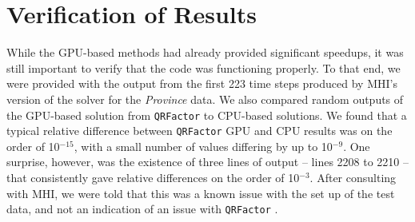 \documentclass[11pt,letterpaper]{article}
\newcommand{\qrf}{\texttt{QRFactor} }
\begin{document}

\section*{Verification of Results}

While the GPU-based methods had already provided significant speedups, it was still important to verify that the 
code was functioning properly. To that end, we were provided with the output from the first 223 time steps produced
by MHI's version of the solver for the \emph{Province} data. We also compared random outputs of the GPU-based solution 
from \qrf to CPU-based solutions. We found that a typical relative difference between \qrf GPU and CPU results was on
the order of 10$^{-15}$, with a small number of values differing by up to 10$^{-9}$. One surprise, however, was the 
existence of three lines of output -- lines 2208 to 2210 -- that consistently gave relative differences on the order 
of 10$^{-3}$. After consulting with MHI, we were told that this was a known issue with the set up of the
test data, and not an indication of an issue with \qrf\!\!.

\end{document}
